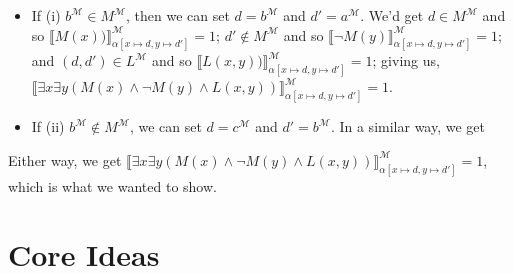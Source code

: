 \begin{enumerate}[\thesection.1]
\begin{itemize}
		\begin{itemize}
			
			\item If (i) $b^\mathcal{M}\in M^\mathcal{M}$, then we can set $d=b^\mathcal{M}$ and $d'=a^\mathcal{M}$. We'd get $d\in M^\mathcal{M}$ and so $\llbracket M(x))\rrbracket_{\alpha[x\mapsto d, y\mapsto d']}^\mathcal{M}=1$; $d'\notin M^\mathcal{M}$ and so $\llbracket\neg M(y)\rrbracket_{\alpha[x\mapsto d, y\mapsto d']}^\mathcal{M}=1$; and $( d,d')\in L^\mathcal{M}$ and so $\llbracket L(x,y))\rrbracket_{\alpha[x\mapsto d, y\mapsto d']}^\mathcal{M}=1$; giving us, $\llbracket \exists x\exists y(M(x)\land \neg M(y)\land L(x,y))\rrbracket_{\alpha[x\mapsto d, y\mapsto d']}^\mathcal{M}=1$. 
			
		\item If (ii) $b^\mathcal{M}\notin M^\mathcal{M}$, we can set $d=c^\mathcal{M}$ and $d'=b^\mathcal{M}$. In a similar way, we get 
				
		\end{itemize}

Either way, we get $\llbracket \exists x\exists y(M(x)\land \neg M(y)\land L(x,y))\rrbracket_{\alpha[x\mapsto d, y\mapsto d']}^\mathcal{M}=1$, which is what we wanted to show.

	\end{itemize}
	
	\smiley

	\end{enumerate}



\section{Core Ideas}

